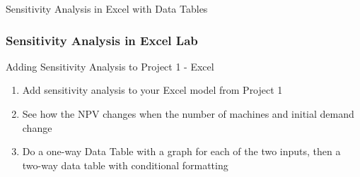 \documentclass[handout, 11pt]{beamer}
\begin{document}
\begin{section}[SA Excel]{Sensitivity Analysis in Excel with Data Tables}
\begin{frame}
\frametitle{Sensitivity Analysis in Excel Lab}
{
\begin{block}{Adding Sensitivity Analysis to Project 1 - Excel}
\begin{enumerate}
\item Add sensitivity analysis to your Excel model from Project 1
\item See how the NPV changes when the number of machines and initial demand change
\item Do a one-way Data Table with a graph for each of the two inputs, then a two-way data table with conditional formatting
\end{enumerate}
\vfill
\end{block}
}
\label{labs:sensitivity-analysis-in-excel-lab-1}
\end{frame}
\end{section}
\end{document}
